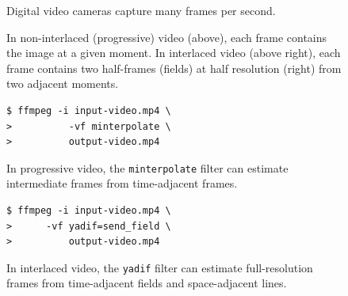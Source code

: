 \begingroup
\centering
\begin{subfigure}{\linewidth}

\vspace{-16pt}
\caption{Digital video cameras capture many frames per second.}
\end{subfigure}
%
\par\vspace{15pt}%
\begin{subfigure}[t]{0.45\linewidth}

\caption{In non-interlaced (progressive) video (above), each frame contains the image at a given moment. In interlaced video (above right), each frame contains two half-frames (fields) at half resolution (right) from two adjacent moments.}
\end{subfigure}\hspace{10pt}%
\begin{subfigure}[t]{0.45\linewidth}

\par

\end{subfigure}
\par\vspace{15pt}%
\begin{subfigure}[t]{0.45\linewidth}
\leavevmode\kern28pt
\begin{BVerbatim}
$ ffmpeg -i input-video.mp4 \
>          -vf minterpolate \
>          output-video.mp4
\end{BVerbatim}
\par\vspace{2.5pt}%

\vspace{-4pt}
\caption{In progressive video, the \texttt{minterpolate} filter can estimate intermediate frames from time-adjacent frames.}
\end{subfigure}\hspace{10pt}%
\begin{subfigure}[t]{0.45\linewidth}
\leavevmode\kern28pt
\begin{BVerbatim}
$ ffmpeg -i input-video.mp4 \
>      -vf yadif=send_field \
>          output-video.mp4
\end{BVerbatim}
\par\vspace{2.5pt}%

\vspace{-4pt}
\caption{In interlaced video, the \texttt{yadif} filter can estimate full-resolution frames from time-adjacent fields and space-adjacent lines.}
\end{subfigure}\par
\endgroup